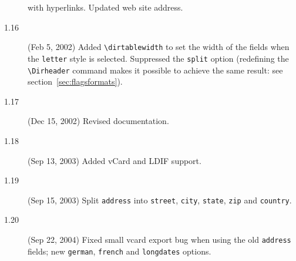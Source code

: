 \documentclass[10pt]{article}
\renewcommand{\Dirheader}[1]{\item\hspace{-\dirindent}\textbf{\MakeUppercase{#1}}}
\begin{document}
\begin{description}
with hyperlinks. Updated web site address.
\item[1.16] (Feb 5, 2002) 
Added \verb'\dirtablewidth' to set the width of the fields when the
\texttt{letter} style is selected. Suppressed the \texttt{split} option
(redefining the \verb'\Dirheader' command makes it possible to achieve the
same result: see section~\ref{sec:flagsformats}).
\item[1.17] (Dec 15, 2002)
Revised documentation.
\item[1.18] (Sep 13, 2003)
Added vCard and LDIF support.
\item[1.19] (Sep 15, 2003)
Split \texttt{address} into \texttt{street}, \texttt{city}, \texttt{state},
\texttt{zip} and \texttt{country}.
\item[1.20] (Sep 22, 2004)
Fixed small vcard export bug when using the old \texttt{address} fields;
new \texttt{german}, \texttt{french} and \texttt{longdates} options.
\end{description}
\end{document}
